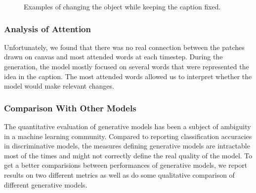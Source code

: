 \documentclass{article} %
\begin{document}
\begin{figure}[!h]
\captionsetup[subfigure]{labelformat=empty}
\begin{center}
\quad
%
\quad
%
\quad
%
\quad
%
\end{center}
\caption{Examples of changing the object while keeping the caption fixed.}
\label{fig:genimages3}
\vspace{-0.3cm}
\end{figure}

\subsubsection{Analysis of Attention}

Unfortunately, we found that there was no real connection between the patches drawn on canvas and most attended words at each timestep. During the generation, the model mostly focused on several words that were represented the idea in the caption. The most attended words allowed us to interpret whether the model would make relevant changes. 

\subsubsection{Comparison With Other Models}
The quantitative evaluation of generative models has been a subject of ambiguity in a machine learning community. Compared to reporting classification accuracies in discriminative models, the measures defining generative models are intractable most of the times and might not correctly define the real quality of the model. To get a better comparisions between performances of generative models, we report results on two different metrics as well as do some qualitative comparison of different generative models.
\end{document}
